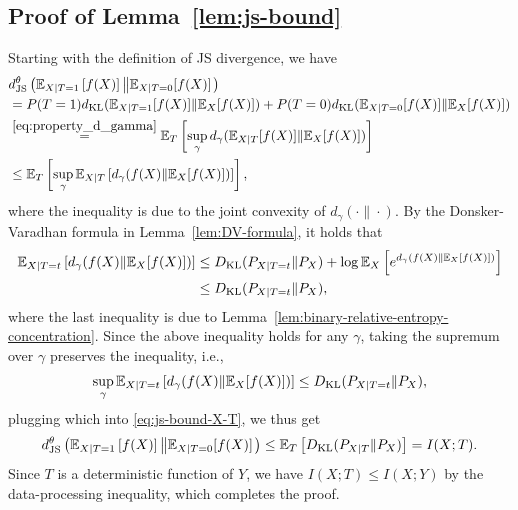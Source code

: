 \documentclass[onecolumn,romanappendices,10pt]{IEEEtran}
\newcommand{\EE}{{\mathbb{E}}}
\begin{document}
	\subsection{Proof of Lemma~\ref{lem:js-bound}}\label{subapp:js-bound}
	Starting with the definition of JS divergence, we have
	\begin{equation}
		\begin{aligned}
			&d^\theta_{\textnormal{JS}} \left( \EE_{X|T=1} \left[ f(X) \right] \left\| \EE_{X|T=0} [f(X)] \right. \right) \\
			&= P(T=1) d_{\textnormal{KL}}(\EE_{X|T = 1} [f(X)] \| \EE_{X} [f(X)]) + P(T=0) d_{\textnormal{KL}}(\EE_{X|T=0} [f(X)] \| \EE_{X} [f(X)]) \\
			&\overset{\eqref{eq:property_d_gamma}}{=} \EE_{T} \left[ \sup_{\gamma} d_{\gamma}(\EE_{X|T} [f(X)] \| \EE_{X} [f(X)]) \right] \\
			&\leq \EE_{T} \left[ \sup_{\gamma} \EE_{X | T} \left[ d_{\gamma}(f(X) \| \EE_{X} [f(X)]) \right] \right],
		\end{aligned}\label{eq:js-bound-X-T}
	\end{equation}
	where the inequality is due to the joint convexity of $d_{\gamma}(\cdot \| \cdot)$. By the Donsker-Varadhan formula in Lemma~\ref{lem:DV-formula}, it holds that
	\begin{equation}
		\begin{aligned}
			\EE_{X|T=t} \left[ d_{\gamma}(f(X) \| \EE_{X} [f(X)]) \right] &\leq D_{\textnormal{KL}} (P_{X|T=t} \| P_X) + \log \EE_{X} \left[ e^{d_{\gamma}(f(X) \| \EE_{X} [f(X)])} \right] \\
			&\leq D_{\textnormal{KL}} (P_{X|T=t} \| P_X),
		\end{aligned}\label{eq:d_gamma_bound}
	\end{equation}
	where the last inequality is due to Lemma~\ref{lem:binary-relative-entropy-concentration}. Since the above inequality holds for any $\gamma$, taking the supremum over $\gamma$ preserves the inequality, i.e.,
	\begin{equation}
		\begin{aligned}
			\sup_{\gamma} \EE_{X|T=t} \left[ d_{\gamma}(f(X) \| \EE_{X} [f(X)]) \right] \leq D_{\textnormal{KL}} (P_{X|T=t} \| P_X),
		\end{aligned}
	\end{equation}
	plugging which into \eqref{eq:js-bound-X-T}, we thus get
	\begin{equation}
		\begin{aligned}
			d^\theta_{\textnormal{JS}} \left( \EE_{X|T=1} \left[ f(X) \right] \left\| \EE_{X|T=0} [f(X)] \right. \right) \leq \EE_{T} \left[ D_{\textnormal{KL}} (P_{X|T} \| P_X) \right] = I(X; T).
		\end{aligned}
	\end{equation}
	Since $T$ is a deterministic function of $Y$, we have $I(X; T) \leq I(X; Y)$ by the data-processing inequality, which completes the proof.
	
\end{document}
